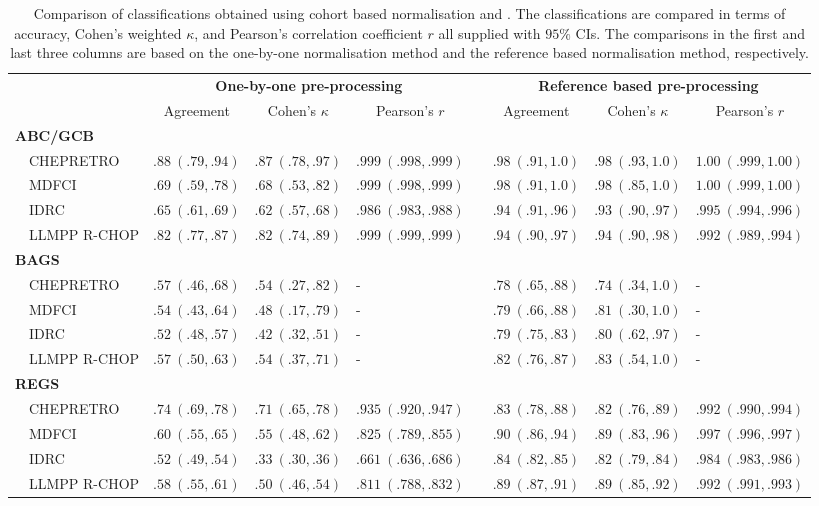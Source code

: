 \begin{table}[!tbp]
{\scriptsize
\caption{Comparison of classifications obtained using cohort based
normalisation and \hemaClass{}.
The classifications are compared in terms of accuracy, Cohen's weighted
$\kappa$, and Pearson's correlation coefficient $r$ all supplied with $95\%$
CIs. The comparisons in the first and last three columns are based on the
one-by-one normalisation method and the reference based normalisation method,
respectively.\label{tab:classALL}} 
\begin{center}
\begin{tabular}{llllclll}
\hline\hline
\multicolumn{1}{l}{\bfseries }&\multicolumn{3}{c}{\bfseries One-by-one pre-processing}&\multicolumn{1}{c}{\bfseries }&\multicolumn{3}{c}{\bfseries Reference based pre-processing}\tabularnewline
\cline{2-4} \cline{6-8}
\multicolumn{1}{l}{}&\multicolumn{1}{c}{Agreement}&\multicolumn{1}{c}{Cohen's $\kappa$}&\multicolumn{1}{c}{Pearson's $r$}&\multicolumn{1}{c}{}&\multicolumn{1}{c}{Agreement}&\multicolumn{1}{c}{Cohen's $\kappa$}&\multicolumn{1}{c}{Pearson's $r$}\tabularnewline
\hline
{\bfseries ABC/GCB}&&&&&&&\tabularnewline
~~CHEPRETRO&$.88~(.79, .94)$&$.87~(.78, .97)$&$.999~(.998, .999)$&&$.98~(.91, 1.0)$&$.98~(.93, 1.0)$&$1.00~(.999, 1.00)$\tabularnewline
~~MDFCI&$.69~(.59, .78)$&$.68~(.53, .82)$&$.999~(.998, .999)$&&$.98~(.91, 1.0)$&$.98~(.85, 1.0)$&$1.00~(.999, 1.00)$\tabularnewline
~~IDRC&$.65~(.61, .69)$&$.62~(.57, .68)$&$.986~(.983, .988)$&&$.94~(.91, .96)$&$.93~(.90, .97)$&$.995~(.994, .996)$\tabularnewline
~~LLMPP R-CHOP&$.82~(.77, .87)$&$.82~(.74, .89)$&$.999~(.999, .999)$&&$.94~(.90, .97)$&$.94~(.90, .98)$&$.992~(.989, .994)$\tabularnewline
\hline
{\bfseries BAGS}&&&&&&&\tabularnewline
~~CHEPRETRO&$.57~(.46, .68)$&$.54~(.27, .82)$&-&&$.78~(.65, .88)$&$.74~(.34, 1.0)$&-\tabularnewline
~~MDFCI&$.54~(.43, .64)$&$.48~(.17, .79)$&-&&$.79~(.66, .88)$&$.81~(.30, 1.0)$&-\tabularnewline
~~IDRC&$.52~(.48, .57)$&$.42~(.32, .51)$&-&&$.79~(.75, .83)$&$.80~(.62, .97)$&-\tabularnewline
~~LLMPP R-CHOP&$.57~(.50, .63)$&$.54~(.37, .71)$&-&&$.82~(.76, .87)$&$.83~(.54, 1.0)$&-\tabularnewline
\hline
{\bfseries REGS}&&&&&&&\tabularnewline
~~CHEPRETRO&$.74~(.69, .78)$&$.71~(.65, .78)$&$.935~(.920, .947)$&&$.83~(.78, .88)$&$.82~(.76, .89)$&$.992~(.990, .994)$\tabularnewline
~~MDFCI&$.60~(.55, .65)$&$.55~(.48, .62)$&$.825~(.789, .855)$&&$.90~(.86, .94)$&$.89~(.83, .96)$&$.997~(.996, .997)$\tabularnewline
~~IDRC&$.52~(.49, .54)$&$.33~(.30, .36)$&$.661~(.636, .686)$&&$.84~(.82, .85)$&$.82~(.79, .84)$&$.984~(.983, .986)$\tabularnewline
~~LLMPP R-CHOP&$.58~(.55, .61)$&$.50~(.46, .54)$&$.811~(.788, .832)$&&$.89~(.87, .91)$&$.89~(.85, .92)$&$.992~(.991, .993)$\tabularnewline
\hline
\end{tabular}\end{center}}

\end{table}
